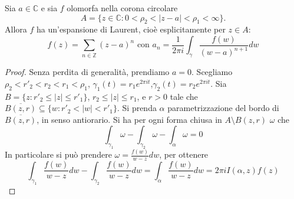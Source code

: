 \begin{thm}
    Sia $a\in\mathbb{C}$ e sia $f$ olomorfa nella corona circolare
    \[
        A = \{z\in\mathbb{C}:0<\rho_2<|z-a|<\rho_1<\infty\}.
    \]
    Allora $f$ ha un'espansione di Laurent, cio\`e esplicitamente per $z\in A$:
    \[
        f(z) = \sum_{n\in\mathbb{Z}}(z-a)^n \text{\ con\ }
        a_n = \frac{1}{2\pi i} \int_\gamma \frac{f(w)}{(w-a)^{n+1}}dw
    \]
\end{thm}
\begin{proof}
    Senza perdita di generalit\`a, prendiamo $a=0$. Scegliamo $\rho_2 <
    r'_2<r_2<r_1<\rho_1$, $\gamma_1(t)=r_1e^{2\pi i t}$,$\gamma_2(t)=r_2e^{2\pi
    i t}$.
    Sia $B=\{z: r'_2\leq |z| \leq r'_1\}$, $r_2\leq |z| \leq r_1$, e $r>0$ tale
    che $\overline{B(z,r)}\subseteq \{w: r'_2<|w|<r'_1\}$. Si prenda $\alpha$
    parametrizzazione del bordo di $\overline{B(z,r)}$, in senso antiorario.
    Si ha per ogni forma chiusa in $A\setminus B(z,r)$ $\omega$ che
    \[
        \int_{\gamma_1}\omega-\int_{\gamma_2}\omega-\int_{\alpha}\omega=0
    \]
    In particolare si pu\`o prendere $\omega = \frac{f(w)}{w-z}dw$, per ottenere
    \[
        \int_{\gamma_1}\frac{f(w)}{w-z}dw - \int_{\gamma_2}\frac{f(w)}{w-z}dw =
        \int_{\alpha}\frac{f(w)}{w-z}dw = 2\pi i I(\alpha,z) f(z)
    \]


\end{proof}

